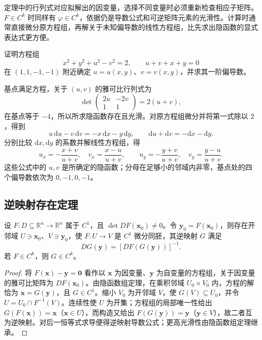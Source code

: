 定理中的行列式对应拟解出的因变量，选择不同变量时必须重新检查相应子矩阵。$F\in C^k$ 时同样有 $\varphi\in C^k$，依据仍是导数公式和可逆矩阵元素的光滑性。计算时通常直接微分原方程组，再解关于未知偏导数的线性方程组，比先求出隐函数的显式表达式更方便。

\begin{example}
\label{ex:implicit-system-computation-ch14}
证明方程组
\[
    x^2+y^2+u^2-v^2=2,\qquad u+v+x+y=0
\]
在 $(1,1,-1,-1)$ 附近确定 $u=u(x,y)$、$v=v(x,y)$，并求其一阶偏导数。
\end{example}
\begin{solve}
基点满足方程，关于 $(u,v)$ 的雅可比行列式为
\[
    \det\begin{pmatrix}2u&-2v\\1&1\end{pmatrix}
    =2(u+v),
\]
在基点等于 $-4$，所以所求隐函数存在且光滑。对原方程组微分并将第一式除以 $2$，得到
\[
    u\,\mathrm du-v\,\mathrm dv=-x\,\mathrm dx-y\,\mathrm dy,
    \qquad \mathrm du+\mathrm dv=-\mathrm dx-\mathrm dy.
\]
分别比较 $\mathrm dx,\mathrm dy$ 的系数并解线性方程组，得
\[
    u_x=-\frac{x+v}{u+v},\quad v_x=\frac{x-u}{u+v},\qquad
    u_y=-\frac{y+v}{u+v},\quad v_y=\frac{y-u}{u+v}.
\]
这些公式中的 $u,v$ 是所确定的隐函数；分母在足够小的邻域内非零，基点处的四个偏导数依次为 $0,-1,0,-1$。
\end{solve}

\subsection{逆映射存在定理}
\label{subsec:inverse-mapping-existence-theorem}

\begin{theorem}[逆映射存在定理]
\label{thm:inverse-function-ch14}
设 $F:D\subseteq\mathbb R^n\to\mathbb R^n$ 属于 $C^1$，且 $\det DF(\boldsymbol x_0)\ne0$。令 $\boldsymbol y_0=F(\boldsymbol x_0)$，则存在开邻域 $U\ni\boldsymbol x_0$、$V\ni\boldsymbol y_0$，使 $F:U\to V$ 是 $C^1$ 微分同胚，其逆映射 $G$ 满足
\[
    DG(\boldsymbol y)=[DF(G(\boldsymbol y))]^{-1}.
\]
若 $F\in C^k$，则 $G\in C^k$。
\end{theorem}
\begin{proof}
将 $F(\boldsymbol x)-\boldsymbol y=\boldsymbol0$ 看作以 $\boldsymbol x$ 为因变量、$\boldsymbol y$ 为自变量的方程组，关于因变量的雅可比矩阵为 $DF(\boldsymbol x_0)$。由隐函数组定理，在乘积邻域 $U_0\times V_0$ 内，方程的解恰为 $\boldsymbol x=G(\boldsymbol y)$，且 $G\in C^1$。缩小 $V_0$ 为开邻域 $V$，使 $G(V)\subseteq U_0$，并令 $U=U_0\cap F^{-1}(V)$。连续性使 $U$ 为开集；方程组的局部唯一性给出 $G(F(\boldsymbol x))=\boldsymbol x$（$\boldsymbol x\in U$），而构造又给出 $F(G(\boldsymbol y))=\boldsymbol y$（$\boldsymbol y\in V$），故二者互为逆映射。对后一恒等式求导便得逆映射导数公式；更高光滑性由隐函数组定理继承。
\end{proof}

